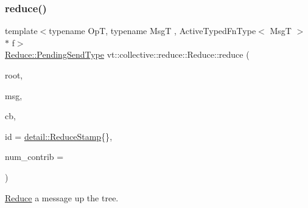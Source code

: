 \mbox{\label{structvt_1_1collective_1_1reduce_1_1_reduce_a3630a98801fa91fd9a0e5ffdf8731650}} 
\subsubsection{\texorpdfstring{reduce()}{reduce()}\hspace{0.1cm}{\footnotesize\ttfamily [5/10]}}
{\footnotesize\ttfamily template$<$typename OpT, typename MsgT , Active\+Typed\+Fn\+Type$<$ Msg\+T $>$ $\ast$ f$>$ \\
\hyperlink{structvt_1_1collective_1_1reduce_1_1_reduce_a0474b491f3c93014d9a0ce0356c6bfd5}{Reduce\+::\+Pending\+Send\+Type} vt\+::collective\+::reduce\+::\+Reduce\+::reduce (\begin{DoxyParamCaption}\item[{\hyperlink{namespacevt_a866da9d0efc19c0a1ce79e9e492f47e2}{Node\+Type} const \&}]{root,  }\item[{MsgT $\ast$}]{msg,  }\item[{\hyperlink{namespacevt_a57b238783d05de96bc2c4027f7073b7f}{Callback}$<$ MsgT $>$}]{cb,  }\item[{\hyperlink{namespacevt_1_1collective_1_1reduce_1_1detail_abcd205dec83706f347d55c7528bf2664}{detail\+::\+Reduce\+Stamp}}]{id = {\ttfamily \hyperlink{namespacevt_1_1collective_1_1reduce_1_1detail_abcd205dec83706f347d55c7528bf2664}{detail\+::\+Reduce\+Stamp}\{\}},  }\item[{\hyperlink{structvt_1_1collective_1_1reduce_1_1_reduce_a6c3e63aca10c31d2823b0b18cf9762a4}{Reduce\+Num\+Type} const \&}]{num\+\_\+contrib = {} }\end{DoxyParamCaption})}



\hyperlink{structvt_1_1collective_1_1reduce_1_1_reduce}{Reduce} a message up the tree. 


